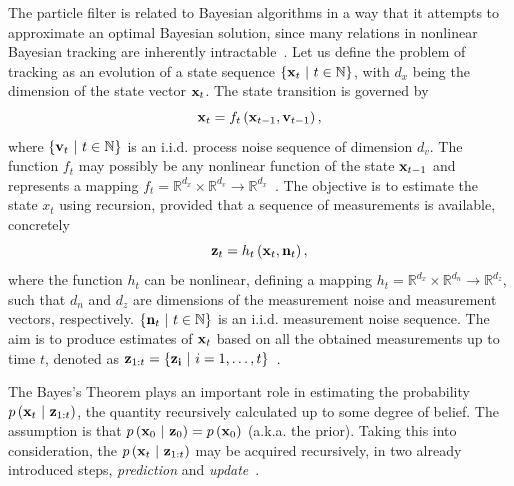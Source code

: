 The particle filter is related to Bayesian algorithms in a way that it attempts to approximate an optimal Bayesian solution, since many relations in nonlinear Bayesian tracking are inherently intractable~\cite{Arulampalam2007}. Let us define the problem of tracking as an evolution of a state sequence $\left\{ {\mathbf{x}_t \ | \ t \in \mathbb{N}} \right\}$, with $d_x$ being the dimension of the state vector $\mathbf{x}_t$. The state transition is governed by
\begin{equation}
    \label{eq:ProbModelStateEvolution}
    \mathbf{x}_t = {f_t} \left( \mathbf{x}_{t - 1}, \mathbf{v}_{t - 1} \right),
\end{equation}
where $\left\{ {\mathbf{v}_t \ | \ t \in \mathbb{N}} \right\}$ is an i.i.d. process noise sequence of dimension $d_v$. The function $f_t$ may possibly be any nonlinear function of the state $\mathbf{x}_{t - 1}$ and represents a mapping $f_t = \mathbb{R}^{d_x} \times \mathbb{R}^{d_v} \to \mathbb{R}^{d_x}$~\cite{Arulampalam2007}. The objective is to estimate the state $x_t$ using recursion, provided that a sequence of measurements is available, concretely
\begin{equation}
    \mathbf{z}_t = {h_t} \left( \mathbf{x}_t, \mathbf{n}_t \right),
\end{equation}
where the function $h_t$ can be nonlinear, defining a mapping $h_t = \mathbb{R}^{d_x} \times \mathbb{R}^{d_n} \to \mathbb{R}^{d_z}$, such that $d_n$ and $d_z$ are dimensions of the measurement noise and measurement vectors, respectively. $\left\{ {\mathbf{n}_t \ | \ t \in \mathbb{N}} \right\}$ is an i.i.d. measurement noise sequence. The aim is to produce estimates of $\mathbf{x}_t$ based on all the obtained measurements up to time $t$, denoted as $\mathbf{z}_{1:t} = \left\{ {\mathbf{z_i} \ | \ i = 1, \dots, t} \right\}$~\cite{Arulampalam2007}.

The Bayes's Theorem plays an important role in estimating the probability $p \left( \mathbf{x}_t \ | \ \mathbf{z}_{1:t} \right)$, the quantity recursively calculated up to some degree of belief. The assumption is that $p \left( \mathbf{x}_0 \ | \ \mathbf{z}_0 \right) = p \left( \mathbf{x}_0 \right)$ (a.k.a. the prior). Taking this into consideration, the $p \left( \mathbf{x}_t \ | \ \mathbf{z}_{1:t} \right)$ may be acquired recursively, in two already introduced steps, \emph{prediction} and \emph{update}~\cite{Arulampalam2007}.

